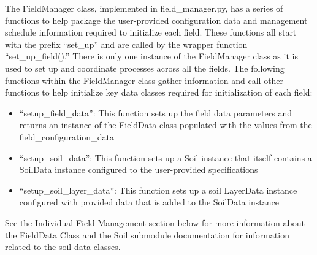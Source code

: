The FieldManager class, implemented in field\_manager.py, has a series of functions to help package the user-provided configuration data and management schedule information required to initialize each field. These functions all start with the prefix “set\_up” and are called by the wrapper function “set\_up\_field().” There is only one instance of the FieldManager class as it is used to set up and coordinate processes across all the fields. The following functions within the FieldManager class gather information and call other functions to help initialize key data classes required for initialization of each field:
\begin{itemize}
    \item “setup\_field\_data”: This function sets up the field data parameters and returns an instance of the FieldData class populated with the values from the field\_configuration\_data 
    \item “setup\_soil\_data”: This function sets up a Soil instance that itself contains a SoilData instance configured to the user-provided specifications
    \item “setup\_soil\_layer\_data”: This function sets up a soil LayerData instance configured with provided data that is added to the SoilData instance
\end{itemize}

See the Individual Field Management section below for more information about the FieldData Class and the Soil submodule documentation for information related to the soil data classes.
\vspace{0.2cm}

